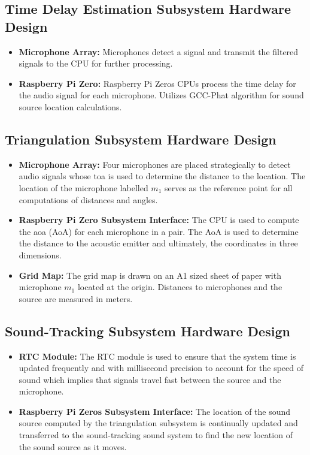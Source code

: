 \documentclass[a4paper,11pt]{article}
\begin{document}
\subsection{Time Delay Estimation Subsystem Hardware Design}
\begin{itemize}
	\item
	\textbf{Microphone Array:} Microphones detect a signal and transmit the filtered signals to the CPU for further processing.
	\item 
	\textbf{Raspberry Pi Zero:} Raspberry Pi Zeros CPUs process the time delay for the audio signal for each microphone. Utilizes GCC-Phat algorithm for sound source location calculations. 
\end{itemize}

\subsection{Triangulation Subsystem Hardware Design}
\begin{itemize}
	\item
	\textbf{Microphone Array:} Four microphones are placed strategically to detect audio signals whose \gls{toa} is used to determine the distance to the location. The location of the microphone labelled $m_1$ serves as the reference point for all computations of distances and angles.
	\item 
	\textbf{Raspberry Pi Zero Subsystem Interface:} The CPU is used to compute the \gls{aoa} (AoA) for each microphone in a pair. The AoA is used to determine the distance to the acoustic emitter and ultimately, the coordinates in three dimensions. 
	\item
	\textbf{Grid Map:} The grid map is drawn on an A1 sized sheet of paper with microphone $m_1$ located at the origin. Distances to microphones and the source are measured in meters.
\end{itemize}

\subsection{Sound-Tracking Subsystem Hardware Design}
\begin{itemize}
	\item
	\textbf{RTC Module:} The RTC module is used to ensure that the system time is updated frequently and with millisecond precision to account for the speed of sound which implies that signals travel fast between the source and the microphone.
	\item
	\textbf{Raspberry Pi Zeros Subsystem Interface:} The location of the sound source computed by the triangulation subsystem is continually updated and transferred to the sound-tracking sound system to find the new location of the sound source as it moves. 
\end{itemize}
\end{document}
